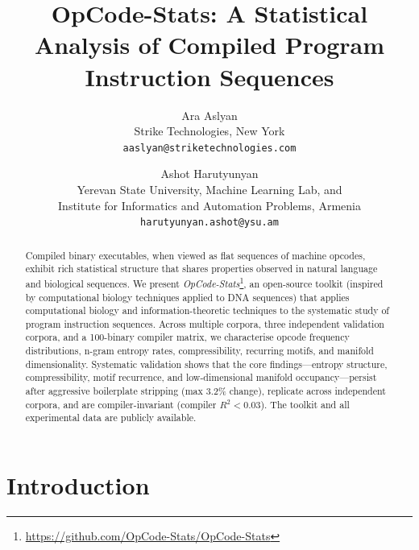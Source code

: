 \documentclass[10pt,twocolumn]{article}
\begin{document}
\title{\textbf{OpCode-Stats: A Statistical Analysis of Compiled Program Instruction Sequences}}

\author{%
  Ara Aslyan\\
  Strike Technologies, New York\\
  \texttt{aaslyan@striketechnologies.com}
  \and
  Ashot Harutyunyan\\
  Yerevan State University, Machine Learning Lab, and\\
  Institute for Informatics and Automation Problems, Armenia\\
  \texttt{harutyunyan.ashot@ysu.am}
}

\date{}

\maketitle

\begin{abstract}
\noindent
Compiled binary executables, when viewed as flat sequences of machine opcodes,
exhibit rich statistical structure that shares properties observed in natural
language and biological sequences.  We present \emph{OpCode-Stats}\footnote{\url{https://github.com/OpCode-Stats/OpCode-Stats}}, an open-source toolkit (inspired by computational biology techniques applied to DNA sequences) that applies
computational biology and information-theoretic techniques to the systematic
study of program instruction sequences.  Across multiple corpora, three
independent validation corpora, and a 100-binary compiler matrix, we
characterise opcode frequency distributions, n-gram entropy rates,
compressibility, recurring motifs, and manifold dimensionality.
Systematic validation shows that the core findings---entropy structure,
compressibility, motif recurrence, and low-dimensional manifold
occupancy---persist after aggressive boilerplate stripping (max 3.2\%
change), replicate across independent corpora, and are compiler-invariant
(compiler $R^2 < 0.03$).  The toolkit and all experimental data are
publicly available.
\end{abstract}

\section{Introduction}
\label{sec:intro}
\end{document}
